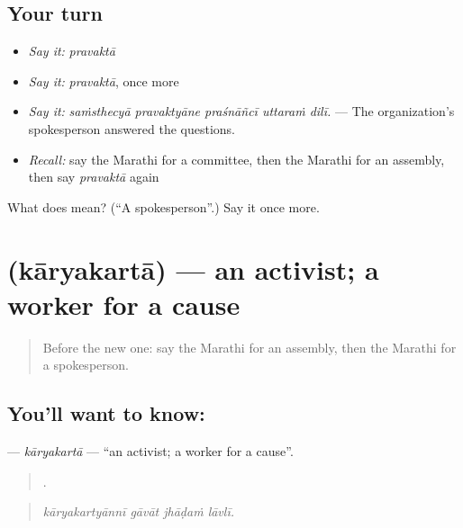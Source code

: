 \subsection*{Your turn}
\begin{itemize}
\raggedright
  \item \emph{Say it:} \emph{pravaktā}
  \item \emph{Say it:} \emph{pravaktā}, once more
  \item \emph{Say it:} \emph{saṁsthecyā pravaktyāne praśnāñcī uttaraṁ dilī.} — The organization's spokesperson answered the questions.
  \item \emph{Recall:} say the Marathi for a committee, then the Marathi for an assembly, then say \emph{pravaktā} again
\end{itemize}

\begin{tcolorbox}[breakable,colback=teal!4,colframe=teal!35!black,title={Before you move on}]
What does  mean? (\textquotedblleft{}A spokesperson\textquotedblright{}.) Say it once more.
\end{tcolorbox}
\section[\texorpdfstring{\mr{कार्यकर्ता} (kāryakartā)}{कार्यकर्ता (kāryakartā)}]{ (kāryakartā) — an activist; a worker for a cause}

\label{lesson:MR-C364-karyakarta}



\begin{quote}
Before the new one: say the Marathi for an assembly, then the Marathi for a spokesperson.
\end{quote}

\subsection*{You'll want to know: }
\textbf{} — \emph{kāryakartā} — \textquotedblleft{}an activist; a worker for a cause\textquotedblright{}.

\begin{quote}
   .
\end{quote}

\begin{quote}
\emph{kāryakartyānnī gāvāt jhāḍaṁ lāvlī.}
\end{quote}

